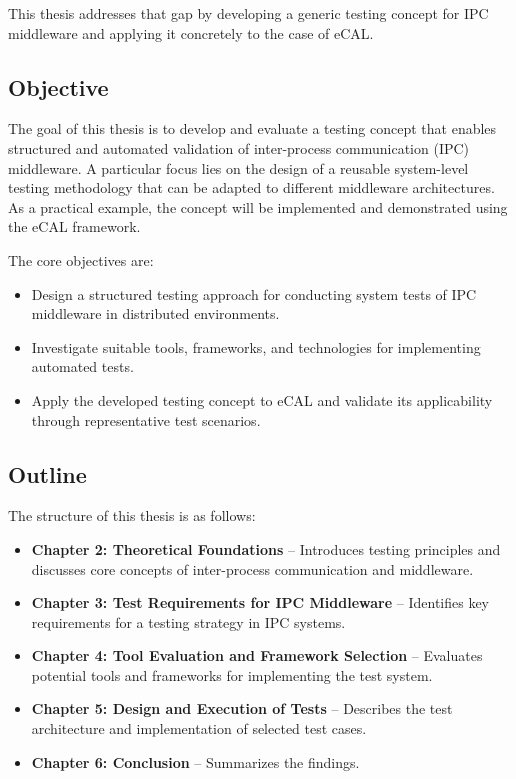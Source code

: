 \vspace{1em}
This thesis addresses that gap by developing a generic testing concept for IPC middleware and applying it concretely to the case of eCAL.

\subsection{Objective}

The goal of this thesis is to develop and evaluate a testing concept that enables structured and automated validation of inter-process communication (IPC) middleware. A particular focus lies on the design of a reusable system-level testing methodology that can be adapted to different middleware architectures. As a practical example, the concept will be implemented and demonstrated using the eCAL framework.

\vspace{1em}
The core objectives are:

\begin{itemize}
	\item Design a structured testing approach for conducting system tests of IPC middleware in distributed environments.
	\item Investigate suitable tools, frameworks, and technologies for implementing automated tests.
	\item Apply the developed testing concept to eCAL and validate its applicability through representative test scenarios.
\end{itemize}

\subsection{Outline}

The structure of this thesis is as follows:

\begin{itemize}
	\item \textbf{Chapter 2: Theoretical Foundations} –  Introduces testing principles and discusses core concepts of inter-process communication and middleware.
	\item \textbf{Chapter 3: Test Requirements for IPC Middleware} – Identifies key requirements for a testing strategy in IPC systems.
	\item \textbf{Chapter 4: Tool Evaluation and Framework Selection} – Evaluates potential tools and frameworks for implementing the test system.
	\item \textbf{Chapter 5: Design and Execution of Tests} – Describes the test architecture and implementation of selected test cases.
	\item \textbf{Chapter 6: Conclusion} – Summarizes the findings.
\end{itemize}








